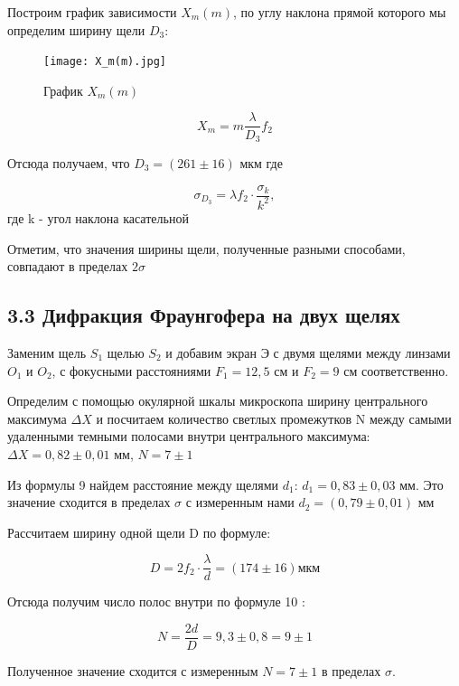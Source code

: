 \documentclass[a4paper,12pt]{report}
\begin{document}
Построим график зависимости $X_{m}(m)$, по углу наклона прямой которого мы определим ширину щели $D_{3}$:

\begin{figure}[H]
\texttt{[image: X\_m(m).jpg]}
\centering
\caption{График $X_{m}(m)$ }
\end{figure}


\begin{equation}
X_{m} = m\frac{\lambda}{D_{3}}f_{2}
\end{equation}

Отсюда получаем, что $D_{3} = (261 \pm 16)$ мкм где

\begin{equation}
\sigma_{D_{3}} = \lambda f_{2}\cdot\frac{\sigma_{k}}{k^2},
\end{equation}
 где k - угол наклона касательной
 
 Отметим, что значения ширины щели, полученные разными способами, совпадают в пределах $2\sigma$
 
\subsection*{3.3 Дифракция Фраунгофера на двух щелях }
 
Заменим щель $S_{1}$ щелью $S_{2}$ и добавим экран Э с двумя щелями между линзами $O_{1}$ и $O_{2}$, с фокусными расстояниями $F_{1} = 12,5$ см и $F_{2} = 9$ см соответственно.

Определим с помощью окулярной шкалы микроскопа ширину центрального максимума $\Delta X$ и посчитаем количество светлых промежутков N между самыми удаленными темными полосами внутри центрального максимума: $\Delta X = 0,82 \pm 0,01$ мм, $N = 7\pm 1$

Из формулы 9 найдем расстояние между щелями $d_{1}$: $d_{1} = 0,83 \pm 0,03$ мм. Это значение сходится в пределах $\sigma$ с измеренным нами $d_{2} = (0,79 \pm 0,01)$ мм

Рассчитаем ширину одной щели D по формуле:

\begin{equation}
D = 2f_{2}\cdot\frac{\lambda}{d} = (174 \pm 16)\text{мкм}
\end{equation}

Отсюда получим число полос внутри по формуле 10 : 

\begin{equation}
N = \frac{2d}{D} = 9,3 \pm 0,8 = 9 \pm 1
\end{equation}

Полученное значение сходится с измеренным $N = 7\pm 1$ в пределах $\sigma$.
\end{document}
